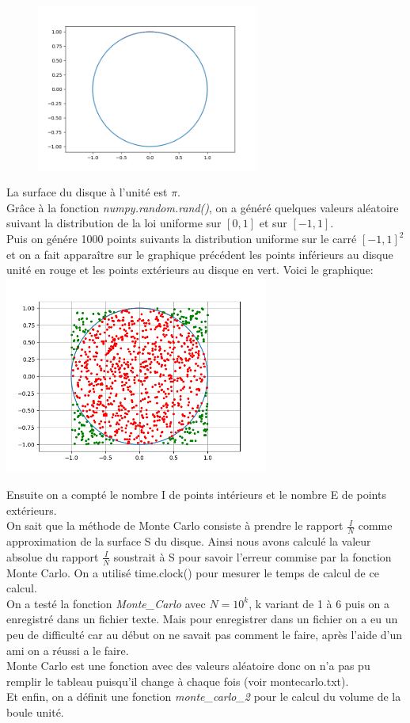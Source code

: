 \documentclass{article}
\begin{document}
\begin{figure}
    \centering
    \includegraphics[width=0.65\textwidth]{cercle.png}
\end{figure}
$$ $$
$$ $$
$$ $$
La surface du disque à l'unité est $\pi$.
$$ $$
$$ $$
$$ $$
$$ $$
$$ $$
Grâce à la fonction \textit{numpy.random.rand()}, on a généré quelques valeurs aléatoire suivant la distribution de la loi uniforme sur $[0,1]$ et sur $[-1,1]$.
\\
Puis on génére 1000 points suivants la distribution uniforme sur le carré $[-1,1]^2$ et on a fait apparaître sur le graphique précédent les points inférieurs au disque unité en rouge et les points extérieurs au disque en vert. Voici le graphique:\\
	\includegraphics[width=0.65\textwidth]{rougevert.png}

Ensuite on a compté le nombre I de points intérieurs et le nombre E de points extérieurs. \\ On sait que la méthode de Monte Carlo consiste à prendre le rapport $\frac{I}{N}$ comme approximation de la surface S du disque. Ainsi nous avons calculé la valeur absolue du rapport $\frac{I}{N}$ soustrait à S pour savoir l'erreur commise par la fonction Monte Carlo. On a utilisé time.clock() pour mesurer le temps de calcul de ce calcul.
\\
On a testé la fonction \textit{Monte\_Carlo} avec $N=10^k$, k variant de 1 à 6 puis on a enregistré dans un fichier texte. Mais pour enregistrer dans un fichier on a eu un peu de difficulté car au début on ne savait pas comment le faire, après l'aide d'un ami on a réussi a le faire.\\
Monte Carlo est une fonction avec des valeurs aléatoire donc on n'a pas pu remplir le tableau puisqu'il change à chaque fois (voir montecarlo.txt).\\

Et enfin, on a définit une fonction \textit{monte\_carlo\_2} pour le calcul du volume de la boule unité.  
\end{document}
